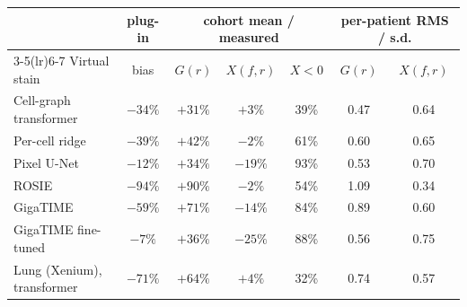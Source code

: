 \begin{tabular}{@{}lcccccc@{}}
\toprule
 & plug-in & \multicolumn{3}{c}{cohort mean / measured} & \multicolumn{2}{c}{per-patient RMS / s.d.} \\
\cmidrule(lr){3-5}\cmidrule(lr){6-7}
Virtual stain & bias & $G(r)$ & $X(f,r)$ & $X<0$ & $G(r)$ & $X(f,r)$ \\
\midrule
Cell-graph transformer & $-34\%$ & $+31\%$ & $+3\%$ & 39\% & 0.47 & 0.64 \\
Per-cell ridge & $-39\%$ & $+42\%$ & $-2\%$ & 61\% & 0.60 & 0.65 \\
Pixel U-Net & $-12\%$ & $+34\%$ & $-19\%$ & 93\% & 0.53 & 0.70 \\
ROSIE & $-94\%$ & $+90\%$ & $-2\%$ & 54\% & 1.09 & 0.34 \\
GigaTIME & $-59\%$ & $+71\%$ & $-14\%$ & 84\% & 0.89 & 0.60 \\
GigaTIME fine-tuned & $-7\%$ & $+36\%$ & $-25\%$ & 88\% & 0.56 & 0.75 \\
\midrule
Lung (Xenium), transformer & $-71\%$ & $+64\%$ & $+4\%$ & 32\% & 0.74 & 0.57 \\
\bottomrule
\end{tabular}
